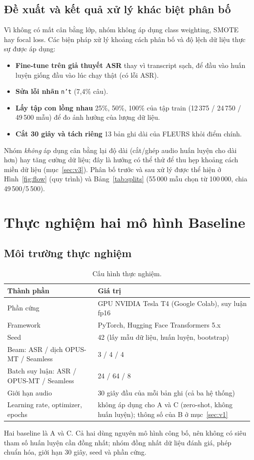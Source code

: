 \documentclass[12pt,a4paper]{article}
\begin{document}
\subsection{Đề xuất và kết quả xử lý khác biệt phân bố}
Vì không có mất cân bằng lớp, nhóm không áp dụng class weighting, SMOTE hay focal loss. Các biện pháp xử lý khoảng cách phân bố và độ lệch dữ liệu thực sự được áp dụng:
\begin{itemize}[nosep]
\item \textbf{Fine-tune trên giả thuyết ASR} thay vì transcript sạch, để đầu vào huấn luyện giống đầu vào lúc chạy thật (có lỗi ASR).
\item \textbf{Sửa lỗi nhãn} \texttt{n't} (7,4\% câu).
\item \textbf{Lấy tập con lồng nhau} 25\%, 50\%, 100\% của tập train (12\,375 / 24\,750 / 49\,500 mẫu) để đo ảnh hưởng của lượng dữ liệu.
\item \textbf{Cắt 30 giây và tách riêng} 13 bản ghi dài của FLEURS khỏi điểm chính.
\end{itemize}
Nhóm \emph{không} áp dụng cân bằng lại độ dài (cắt/ghép audio huấn luyện cho dài hơn) hay tăng cường dữ liệu; đây là hướng có thể thử để thu hẹp khoảng cách miền dữ liệu (mục~\ref{sec:v3}). Phân bố trước và sau xử lý được thể hiện ở Hình~\ref{fig:flow} (quy trình) và Bảng~\ref{tab:splits} (55\,000 mẫu chọn từ 100\,000, chia 49\,500/5\,500).

\section{Thực nghiệm hai mô hình Baseline}
\subsection{Môi trường thực nghiệm}
\begin{table}[H]\centering\small
\begin{tabular}{p{5.2cm}p{7.6cm}}\toprule
Thành phần & Giá trị\\\midrule
Phần cứng & GPU NVIDIA Tesla T4 (Google Colab), suy luận fp16\\
Framework & PyTorch, Hugging Face Transformers 5.x\\
Seed & 42 (lấy mẫu dữ liệu, huấn luyện, bootstrap)\\
Beam: ASR / dịch OPUS-MT / Seamless & 3 / 4 / 4\\
Batch suy luận: ASR / OPUS-MT / Seamless & 24 / 64 / 8\\
Giới hạn audio & 30 giây đầu của mỗi bản ghi (cả ba hệ thống)\\
Learning rate, optimizer, epochs & không áp dụng cho A và C (zero-shot, không huấn luyện); thông số của B ở mục~\ref{sec:v1}\\
\bottomrule\end{tabular}
\caption{Cấu hình thực nghiệm.}
\end{table}
Hai baseline là A và C. Cả hai dùng nguyên mô hình công bố, nên không có siêu tham số huấn luyện cần đồng nhất; nhóm đồng nhất dữ liệu đánh giá, phép chuẩn hóa, giới hạn 30 giây, seed và phần cứng.
\end{document}
